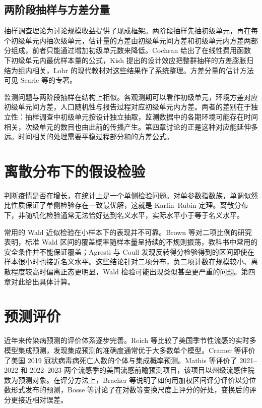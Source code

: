 \subsection{两阶段抽样与方差分量}

抽样调查理论为讨论规模收益提供了现成框架。两阶段抽样先抽初级单元，再在每个初级单元内抽次级单元，估计量的方差由初级单元间方差和初级单元内方差两部分组成，前者只能通过增加初级单元数来降低\citep{cochran1977sampling}。Cochran 给出了在线性费用函数下初级单元内最优样本量的公式，Kish 提出的设计效应把整群抽样的方差膨胀归结为组内相关\citep{kish1965survey}，Lohr 的现代教材对这些结果作了系统整理\citep{lohr2022sampling}。方差分量的估计方法可见 Searle 等的专著\citep{searle1992variance}。

监测问题与两阶段抽样在结构上相似。各观测期可以看作初级单元，环境方差对应初级单元间方差，人口随机性与报告过程对应初级单元内方差。两者的差别在于独立性：抽样调查中初级单元按设计独立抽取，监测数据中的各期环境可能存在时间相关，次级单元的数目也由此前的传播产生。第四章讨论的正是这种对应能延伸多远。时间相关的处理需要平稳过程部分和的方差公式\citep{hamilton1994time}。

\section{离散分布下的假设检验}
\label{sec:lit-testing}

判断疫情是否在增长，在统计上是一个单侧检验问题。对单参数指数族，单调似然比性质保证了单侧检验存在一致最优解，这就是 Karlin--Rubin 定理\citep{karlin1956theory, lehmann2005testing}。离散分布下，非随机化检验通常无法恰好达到名义水平，实际水平小于等于名义水平。

常用的 Wald 近似检验在小样本下的表现并不可靠。Brown 等对二项比例的研究表明，标准 Wald 区间的覆盖概率随样本量呈持续的不规则振荡，教科书中常用的安全条件并不能保证覆盖\citep{brown2001interval}；Agresti 与 Coull 发现反转得分检验得到的区间即使在样本很小时也接近名义水平\citep{agresti1998approximate}。这些结论针对二项分布，负二项计数在规模较小、离散程度较高时偏离正态更明显，Wald 检验可能出现类似甚至更严重的问题。第四章对此给出具体计算。

\section{预测评价}
\label{sec:lit-forecast}

近年来传染病预测的评价体系逐步完善。Reich 等比较了美国季节性流感的实时多模型集成预测，发现集成预测的准确度通常优于大多数单个模型\citep{reich2019accuracy}。Cramer 等评价了美国 2019 冠状病毒病死亡人数的个体与集成概率预测\citep{cramer2022evaluation}。Mathis 等评价了 2021--2022 和 2022--2023 两个流感季的美国流感前瞻预测项目，该项目以州级流感住院数为预测对象\citep{mathis2024evaluation}。在评分方法上，Bracher 等说明了如何用加权区间评分评价以分位数形式发布的预测\citep{bracher2021evaluating}，Bosse 等讨论了在对数等变换尺度上评分的好处，变换后的评分更接近相对误差\citep{bosse2023scoring}。

